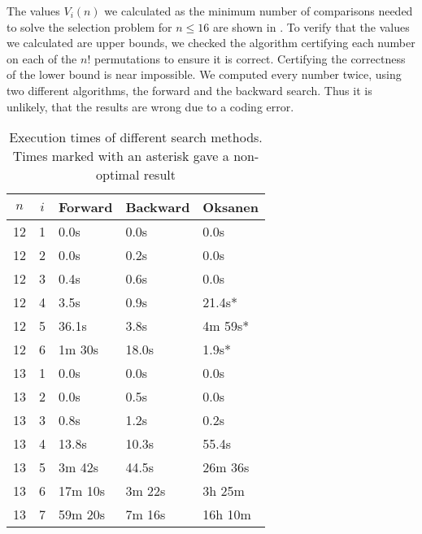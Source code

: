 \documentclass[twoside,leqno,twocolumn]{article}
\begin{document}
The values $V_i(n)$ we calculated as the minimum number of comparisons needed to solve the selection problem for $n \leq 16$ are shown in .
To verify that the values we calculated are upper bounds, we checked the algorithm certifying each number on each of the $n!$ permutations to ensure it is correct.
Certifying the correctness of the lower bound is near impossible.
We computed every number twice, using two different algorithms, the forward and the backward search.
Thus it is unlikely, that the results are wrong due to a coding error.

\begin{table}[!t]
  \renewcommand{\arraystretch}{1.1}
  \caption{Execution times of different search methods. Times marked with an asterisk gave a non-optimal result }
  \label{table:search_algorithms}
  \centering
  \small
  \begin{tabular}{c|c|l|l|l}
    $n$ & $i$ & \textbf{Forward} & \textbf{Backward} & \textbf{Oksanen} \\
    \hline
    12  & 1   & 0.0s             & 0.0s              & 0.0s             \\
    12  & 2   & 0.0s             & 0.2s              & 0.0s             \\
    12  & 3   & 0.4s             & 0.6s              & 0.0s             \\
    12  & 4   & 3.5s             & 0.9s              & 21.4s*           \\
    12  & 5   & 36.1s            & 3.8s              & 4m 59s*          \\
    12  & 6   & 1m 30s           & 18.0s             & 1.9s*            \\
    \hline
    13  & 1   & 0.0s             & 0.0s              & 0.0s             \\
    13  & 2   & 0.0s             & 0.5s              & 0.0s             \\
    13  & 3   & 0.8s             & 1.2s              & 0.2s             \\
    13  & 4   & 13.8s            & 10.3s             & 55.4s            \\
    13  & 5   & 3m 42s           & 44.5s             & 26m 36s          \\
    13  & 6   & 17m 10s          & 3m 22s            & 3h 25m           \\
    13  & 7   & 59m 20s          & 7m 16s            & 16h 10m          \\

\end{tabular}
\end{table}
\end{document}
